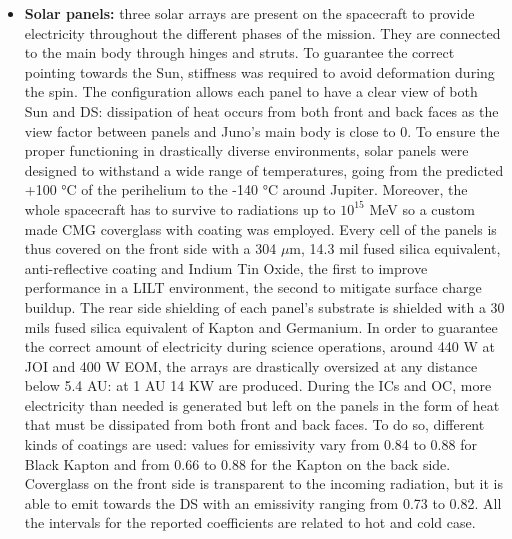 \begin{itemize}
    \item \textbf{Solar panels:} three solar arrays are present on the spacecraft to provide electricity throughout the different phases of the mission. They are connected to the main body through hinges and struts. To guarantee the correct pointing towards the Sun, stiffness was required to avoid deformation during the spin. The configuration allows each panel to have a clear view of both Sun and DS: dissipation of heat occurs from both front and back faces as the view factor between panels and Juno's main body is close to 0. 
    To ensure the proper functioning in drastically diverse environments, solar panels were designed to withstand a wide range of temperatures, going from the predicted +100 °C of the perihelium to the -140 °C around Jupiter\cite{solar_panels_coef}. Moreover, the whole spacecraft has to survive to radiations up to $10^{15}$ MeV so a custom made CMG coverglass with coating was employed. Every cell of the panels is thus covered on the front side with a 304 $\mu$m, 14.3 mil fused silica equivalent\cite{solar_panels_coef}, anti-reflective coating and Indium Tin Oxide, the first to improve performance in a LILT environment, the second to mitigate surface charge buildup\cite{solar_panels_coef}. The rear side shielding of each panel's substrate is shielded with a 30 mils fused silica equivalent of Kapton and Germanium. In order to guarantee the correct amount of electricity during science operations, around 440 W at JOI and 400 W EOM, the arrays are drastically oversized at any distance below 5.4 AU: at 1 AU 14 KW are produced. During the ICs and OC, more electricity than needed is generated but left on the panels in the form of heat that must be dissipated from both front and back faces. To do so, different kinds of coatings are used: %
    values for emissivity vary from 0.84 to 0.88 for Black Kapton and from 0.66 to 0.88 for the Kapton on the back side. Coverglass on the front side is transparent to the incoming radiation, but it is able to emit towards the DS with an emissivity ranging from 0.73 to 0.82. All the intervals for the reported coefficients are related to hot and cold case\cite{solar_panels_coef}.
\end{itemize}